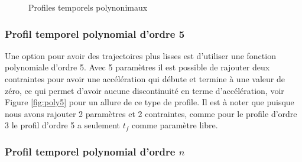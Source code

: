 \begin{figure}[ht]
        \centering
        \caption{Profiles temporels polynonimaux}
			\label{fig:poly_profile}
\end{figure}

\subsubsection{Profil temporel polynomial d'ordre 5}

Une option pour avoir des trajectoires plus lisses est d'utiliser une fonction polynomiale d'ordre 5. Avec 5 paramètres il est possible de rajouter deux contraintes pour avoir une accélération qui débute et termine à une valeur de zéro, ce qui permet d'avoir aucune discontinuité en terme d'accélération, voir Figure \ref{fig:poly5} pour un allure de ce type de profile. Il est à noter que puisque nous avons rajouter 2 paramètres et 2 contraintes, comme pour le profile d'ordre 3 le profil d'ordre 5 a seulement $t_f$ comme paramètre libre. 


\subsubsection{Profil temporel polynomial d'ordre $n$}

